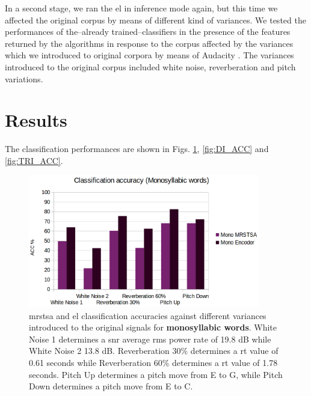 \documentclass[10pt,letterpaper]{article}
\begin{document}
\pagebreak

In a second stage, we ran the \gls{el} in inference mode again, but this time we affected the original corpus by means of different kind of variances. We tested the performances of the--already trained--classifiers in the presence of the features returned by the algorithms in response to the corpus affected by the variances which we introduced to original corpora by means of Audacity \cite{audacity}. The variances introduced to the original corpus included white noise, reverberation and pitch variations. 











\section*{Results}

The classification performances are shown in Figs. \ref{fig:MONO_ACC}, \ref{fig:DI_ACC} and \ref{fig:TRI_ACC}.

\begin{figure}[h!]
    \centering
    \includegraphics[width=0.9\textwidth]{MONO_ACC.png}
    \caption{\gls{mrstsa} and \gls{el} classification accuracies against different variances introduced to the original signals
    for \textbf{monosyllabic words}.
    White Noise 1 determines a \gls{snr} average \gls{rms} power rate of 19.8 dB while White Noise 2 13.8 dB.
    Reverberation 30\% determines a \gls{rt} value of 0.61 seconds while Reverberation 60\% determines a \gls{rt} value of 1.78 seconds.
    Pitch Up determines a pitch move from E to G, while Pitch Down determines a pitch move from E to C.}
    \label{fig:MONO_ACC}
\end{figure}
\end{document}

